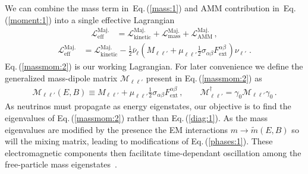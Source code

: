 \documentclass{ws-ijmpa}
\newcommand{\req}[1]{Eq.\,(\ref{#1})}
\begin{document}
We can combine the mass term in~\req{mass:1} and AMM contribution in~\req{moment:1} into a single effective Lagrangian
\begin{align}
\label{massmom:1}
\mathcal{L}_\mathrm{eff}^\mathrm{Maj.} &= \mathcal{L}_\mathrm{kinetic}^\mathrm{Maj.} + \mathcal{L}_\mathrm{mass}^\mathrm{Maj.} + \mathcal{L}_\mathrm{AMM}^\mathrm{Maj.}\,,
\end{align}
%
\begin{align}
\label{massmom:2}
\mathcal{L}_\mathrm{eff}^\mathrm{Maj.} &= \mathcal{L}_\mathrm{kinetic}^\mathrm{Maj.} - \frac{1}{2}\bar\nu_{\ell}\left(M_{\ell\ell'}+\mu_{\ell\ell'}\frac{1}{2}\sigma_{\alpha\beta}F^{\alpha\beta}_\mathrm{ext}\right)\nu_{\ell'}\;.
\end{align}
\req{massmom:2} is our working Lagrangian. For later convenience we define the generalized mass-dipole matrix $\mathcal{M}_{\ell\ell'}$ present in \req{massmom:2} as
\begin{align}
\label{massmom:3}
\mathcal{M}_{\ell\ell'}(E,B)\equiv M_{\ell\ell'}+\mu_{\ell\ell'}\frac{1}{2}\sigma_{\alpha\beta}F^{\alpha\beta}_\mathrm{ext}\,,\qquad \mathcal{M}_{\ell\ell'}^{\dag}=\gamma_{0}\mathcal{M}_{\ell\ell'}\gamma_{0}\,.
\end{align}
As neutrinos must propagate as energy eigenstates, our objective is to find the eigenvalues of \req{massmom:2} rather than \req{diag:1}. As the mass eigenvalues are modified by the presence the EM interactions $m\rightarrow\widetilde m(E,B)$ so will the mixing matrix, leading to modifications of \req{phases:1}. These electromagnetic components then facilitate time-dependant oscillation among the free-particle mass eigenstates~\cite{Giunti:2014ixa}.

\end{document}
